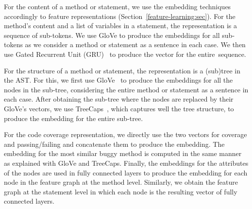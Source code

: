 
For the content of a method or statement, we use the
embedding techniques accordingly to feature representations
(Section~\ref{feature-learning:sec}). For the method's content and a
list of variables in a statement, the representation is a sequence of
sub-tokens. We use GloVe \cite{glove2014} to produce the embeddings
for all sub-tokens as we consider a method or statement as a sentence
in each case. We then use Gated Recurrent Unit (GRU)~\cite{GRU-cho14}
to produce the vector for the entire~sequence.

For the structure of a method or statement, the representation is a
(sub)tree in the AST. For this, we first use GloVe~\cite{glove2014} to
produce the embeddings for all the nodes in the sub-tree, considering
the entire method or statement as a sentence in each case. After
obtaining the sub-tree where the nodes are replaced by their GloVe's
vectors, we use TreeCaps~\cite{bui2021treecaps}, which captures well
the tree structure, to produce the embedding for the entire sub-tree.

For the code coverage representation, we directly use the two vectors
for coverage and passing/failing and concatenate them to produce the
embedding. The embedding for the most similar buggy method is computed
in the same manner as explained with GloVe and TreeCaps. Finally, the
embeddings for the attributes of the nodes are used in fully connected
layers to produce the embedding for each node in the feature graph at
the method level. Similarly, we obtain the feature graph at the
statement level in which each node is the resulting vector of fully
connected layers.


